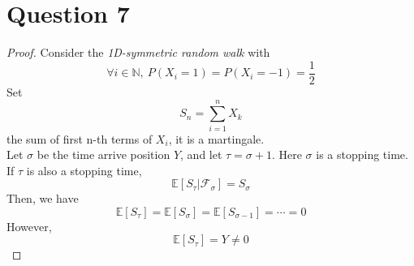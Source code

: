 \documentclass{article}
\begin{document}
\section*{Question 7}
    \begin{proof}
    Consider the \textit{1D-symmetric random walk} with
    $$\forall i\in \mathbb{N},\ P(X_i = 1) = P(X_i = -1) = \frac{1}{2}$$
    Set $$S_n = \sum_{i=1}^n X_k$$the sum of first n-th terms of $X_i$, it is a martingale.\\
    Let $\sigma$ be the time arrive position $Y$, and let $\tau=\sigma+1$. Here $\sigma$ is a stopping time.\\
    If $\tau$ is also a stopping time,
    $$\mathbb{E}[S_\tau|\mathcal{F}_\sigma]=S_\sigma$$
    Then, we have
    $$\mathbb{E}[S_\tau]=\mathbb{E}[S_\sigma]=\mathbb{E}[S_{\sigma-1}]=\cdots=0$$
    However,
    $$\mathbb{E}[S_\tau]=Y\not=0$$

    
    \end{proof}
\end{document}
